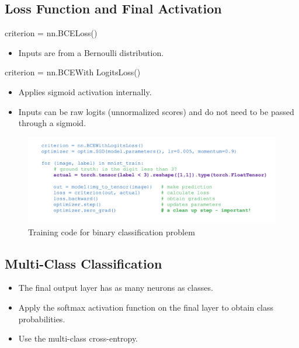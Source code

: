 \documentclass[11pt, english]{article}
\begin{document}
\subsection{Loss Function and Final Activation}
criterion = nn.BCELoss()
\begin{itemize}
    \item Inputs are from a Bernoulli distribution.
\end{itemize}
criterion = nn.BCEWith LogitsLoss()
\begin{itemize}
    \item Applies sigmoid activation internally.
    \item Inputs can be raw logits (unnormalized scores) and do not need to be passed through a sigmoid.
\end{itemize}
\begin{figure}[H]
    \centering
    \includegraphics[width=0.75\linewidth]{Screenshot 2025-01-22 at 4.02.25 PM.png}
    \caption{Training code for binary classification problem}
    \label{fig:enter-label}
\end{figure}
\subsection{Multi-Class Classification}
\begin{itemize}
    \item The final output layer has as many neurons as classes.
    \item Apply the softmax activation function on the final layer to obtain class probabilities.
    \item Use the multi-class cross-entropy.
\end{itemize}
\end{document}
